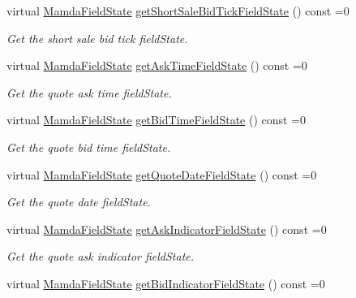 \begin{CompactItemize}
virtual \hyperlink{namespaceWombat_93aac974f2ab713554fd12a1fa3b7d2a}{Mamda\-Field\-State} \hyperlink{classWombat_1_1MamdaQuoteUpdate_a86e2dbc05a27389fac4c47282ebe6ee}{get\-Short\-Sale\-Bid\-Tick\-Field\-State} () const =0
\begin{CompactList}\small\item\em Get the short sale bid tick field\-State. \item\end{CompactList}\item 
virtual \hyperlink{namespaceWombat_93aac974f2ab713554fd12a1fa3b7d2a}{Mamda\-Field\-State} \hyperlink{classWombat_1_1MamdaQuoteUpdate_64e89c53f087044bfe5352e6d45c891d}{get\-Ask\-Time\-Field\-State} () const =0
\begin{CompactList}\small\item\em Get the quote ask time field\-State. \item\end{CompactList}\item 
virtual \hyperlink{namespaceWombat_93aac974f2ab713554fd12a1fa3b7d2a}{Mamda\-Field\-State} \hyperlink{classWombat_1_1MamdaQuoteUpdate_c375bfc99202bfe4f2fe5a9100a8bebc}{get\-Bid\-Time\-Field\-State} () const =0
\begin{CompactList}\small\item\em Get the quote bid time field\-State. \item\end{CompactList}\item 
virtual \hyperlink{namespaceWombat_93aac974f2ab713554fd12a1fa3b7d2a}{Mamda\-Field\-State} \hyperlink{classWombat_1_1MamdaQuoteUpdate_80968cec3430425c8c8f4cb449e36a64}{get\-Quote\-Date\-Field\-State} () const =0
\begin{CompactList}\small\item\em Get the quote date field\-State. \item\end{CompactList}\item 
virtual \hyperlink{namespaceWombat_93aac974f2ab713554fd12a1fa3b7d2a}{Mamda\-Field\-State} \hyperlink{classWombat_1_1MamdaQuoteUpdate_f53101b414b70eff88d9fd62887a93eb}{get\-Ask\-Indicator\-Field\-State} () const =0
\begin{CompactList}\small\item\em Get the quote ask indicator field\-State. \item\end{CompactList}\item 
virtual \hyperlink{namespaceWombat_93aac974f2ab713554fd12a1fa3b7d2a}{Mamda\-Field\-State} \hyperlink{classWombat_1_1MamdaQuoteUpdate_14c2e72cc5dff78c9e5d774d71f5d73b}{get\-Bid\-Indicator\-Field\-State} () const =0

\end{CompactItemize}
